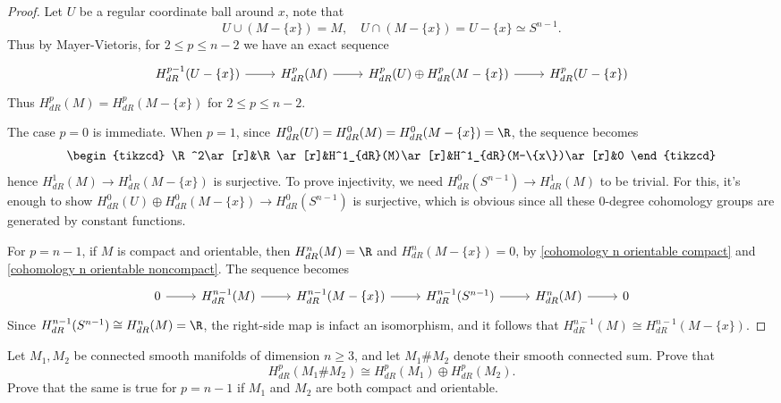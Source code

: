 \begin{proof}
Let $U$ be a regular coordinate ball around $x$, note that
\[U\cup(M-\{x\})=M,\quad U\cap(M-\{x\})=U-\{x\}\simeq S^{n-1}.\]
Thus by Mayer-Vietoris, for $2\leq p\leq n-2$ we have an exact sequence
\[\begin{tikzcd}
H^{p-1}_{dR}(U-\{x\})\ar[r]&H^p_{dR}(M)\ar[r]&H^p_{dR}(U)\oplus H^p_{dR}(M-\{x\})\ar[r]&H^p_{dR}(U-\{x\})
\end{tikzcd}\]
Thus $H^p_{dR}(M)=H^p_{dR}(M-\{x\})$ for $2\leq p\leq n-2$.\par
The case $p=0$ is immediate. When $p=1$, since $H^0_{dR}(U)=H^0_{dR}(M)=H^0_{dR}(M-\{x\})=\R$, the sequence becomes
\[\begin{tikzcd}
\R^2\ar[r]&\R\ar[r]&H^1_{dR}(M)\ar[r]&H^1_{dR}(M-\{x\})\ar[r]&0
\end{tikzcd}\]
hence $H^1_{dR}(M)\to H^1_{dR}(M-\{x\})$ is surjective. To prove injectivity, we need $H^0_{dR}(S^{n-1})\to H^1_{dR}(M)$ to be trivial. For this, it's enough to show $H^0_{dR}(U)\oplus H^0_{dR}(M-\{x\})\to H^0_{dR}(S^{n-1})$ is surjective, which is obvious since all these $0$-degree cohomology groups are generated by constant functions.\par
For $p=n-1$, if $M$ is compact and orientable, then $H^n_{dR}(M)=\R$ and $H^n_{dR}(M-\{x\})=0$, by \cref{cohomology n orientable compact} and \ref{cohomology n orientable noncompact}. The sequence becomes
\[\begin{tikzcd}
0\ar[r]&H^{n-1}_{dR}(M)\ar[r]&H^{n-1}_{dR}(M-\{x\})\ar[r]&H^{n-1}_{dR}(S^{n-1})\ar[r]&H^n_{dR}(M)\ar[r]&0
\end{tikzcd}\]
Since $H^{n-1}_{dR}(S^{n-1})\cong H^n_{dR}(M)=\R$, the right-side map is infact an isomorphism, and it follows that $H^{n-1}_{dR}(M)\cong H^{n-1}_{dR}(M-\{x\})$.
\end{proof}
\begin{exercise}
Let $M_1,M_2$ be connected smooth manifolds of dimension $n\geq 3$, and let $M_1\#M_2$ denote their smooth connected sum. Prove that 
\[H^p_{dR}(M_1\#M_2)\cong H^p_{dR}(M_1)\oplus H^p_{dR}(M_2).\] 
Prove that the same is true for $p=n-1$ if $M_1$ and $M_2$ are both compact and orientable.
\end{exercise}
